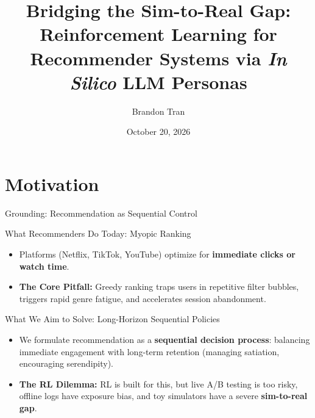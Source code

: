\documentclass[handout]{beamer}
\title[In Silico LLM Personas for RecSys]{\textbf{Bridging the Sim-to-Real Gap:} Reinforcement Learning for Recommender Systems via \textit{In Silico} LLM Personas}
\author{Brandon Tran}
\institute[S\&DS]{Yale University}
\date{October 20, 2026}
\begin{document}
\maketitle

\section{Motivation}

\begin{frame}{Grounding: Recommendation as Sequential Control}
  \begin{block}{What Recommenders Do Today: Myopic Ranking}
    \small
    \begin{itemize}
      \item Platforms (Netflix, TikTok, YouTube) optimize for \textbf{immediate clicks or watch time}.
      \item \textbf{The Core Pitfall:} Greedy ranking traps users in repetitive filter bubbles, triggers rapid genre fatigue, and accelerates session abandonment.
    \end{itemize}
  \end{block}

  \pause
  \vspace{-0.05cm}

  \begin{alertblock}{What We Aim to Solve: Long-Horizon Sequential Policies}
    \small
    \begin{itemize}
      \item We formulate recommendation as a \textbf{sequential decision process}: balancing immediate engagement with long-term retention (managing satiation, encouraging serendipity).
      \item \textbf{The RL Dilemma:} RL is built for this, but live A/B testing is too risky, offline logs have exposure bias, and toy simulators have a severe \textbf{sim-to-real gap}.
    \end{itemize}
  \end{alertblock}
\end{frame}
\end{document}
